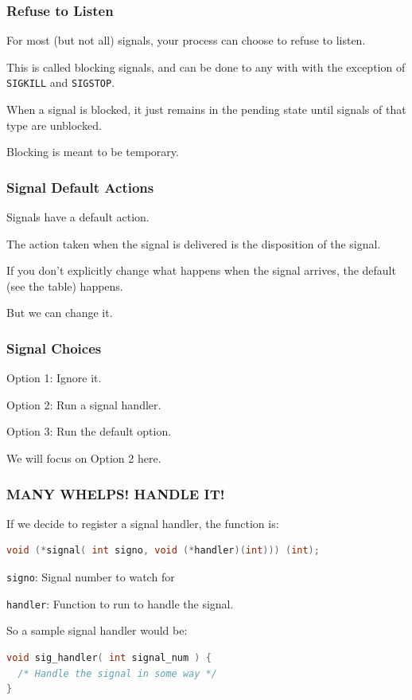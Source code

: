 \begin{frame}
	\frametitle{Refuse to Listen}

	For most (but not all) signals, your process can choose to refuse to listen.

	This is called blocking signals, and can be done to any with with the exception of \texttt{SIGKILL} and \texttt{SIGSTOP}.

	When a signal is blocked, it just remains in the pending state until signals of that type are unblocked.

	Blocking is meant to be temporary.

\end{frame}


\begin{frame}
	\frametitle{Signal Default Actions}

	Signals have a default action.

	The action taken when the signal is delivered is the \alert{disposition} of the signal.

	If you don't explicitly change what happens when the signal arrives, the default (see the table) happens.

	But we can change it.

\end{frame}


\begin{frame}
	\frametitle{Signal Choices}

	Option 1: Ignore it.

	Option 2: Run a signal handler.

	Option 3: Run the default option.

	We will focus on Option 2 here.

\end{frame}


\begin{frame}[fragile]
	\frametitle{MANY WHELPS! HANDLE IT!}

	If we decide to register a signal handler, the function is:
	\begin{lstlisting}[language=C]
void (*signal( int signo, void (*handler)(int))) (int);
\end{lstlisting}

	\texttt{signo}: Signal number to watch for

	\texttt{handler}: Function to run to handle the signal.

	So a sample signal handler would be:
	\begin{lstlisting}[language=C]
void sig_handler( int signal_num ) {
  /* Handle the signal in some way */
}
\end{lstlisting}

\end{frame}


